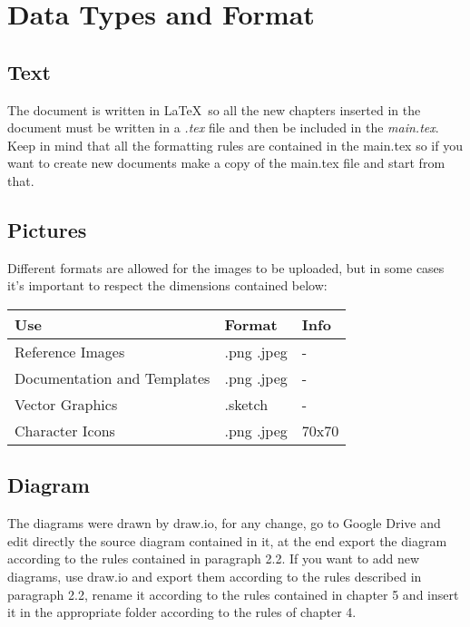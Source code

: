 \section{Data Types and Format}

\subsection{Text}
The document is written in \LaTeX\ so all the new chapters inserted in the document must be written in a \textit{.tex} file and then be included in the \textit{main.tex}. Keep in mind that all the formatting rules are contained in the main.tex so if you want to create new documents make a copy of the main.tex file and start from that.

\subsection{Pictures}
Different formats are allowed for the images to be uploaded, but in some cases it's important to respect the dimensions contained below:

\begin{center}
	\begin{tabular}[c]{| p{8cm} | p{3cm} | p{3cm} |}
		\hline
		\textbf{Use} & \textbf{Format}  & \textbf{Info}\\
		\hline
		Reference Images & .png .jpeg & - \\
		\hline
		Documentation and Templates & .png .jpeg & - \\
		\hline
		Vector Graphics & .sketch & - \\
		\hline
		Character Icons & .png .jpeg & 70x70\\
		\hline
	\end{tabular}
\end{center}



\subsection{Diagram}
The diagrams were drawn by draw.io, for any change, go to Google Drive and edit directly the source diagram contained in it, at the end export the diagram according to the rules contained in paragraph 2.2. If you want to add new diagrams, use draw.io and export them according to the rules described in paragraph 2.2, rename it according to the rules contained in chapter 5 and insert it in the appropriate folder according to the rules of chapter 4.




